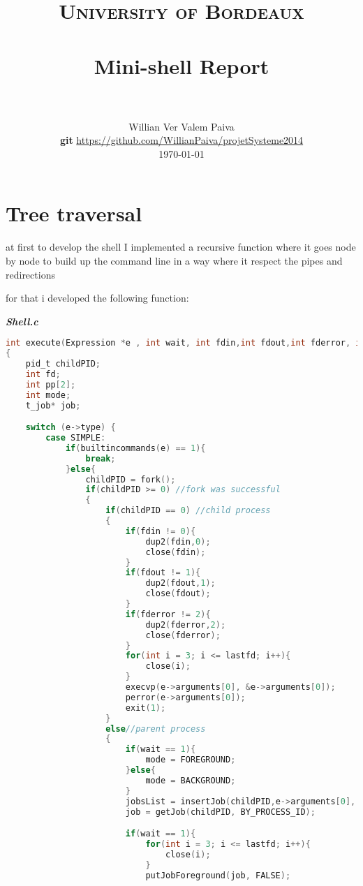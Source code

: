 \documentclass[paper=a4, fontsize=11pt]{scrartcl}
\title{
		\usefont{OT1}{bch}{b}{n}
		\normalfont \normalsize \textsc{University of Bordeaux} \\ [25pt]
		\horrule{0.5pt} \\[0.4cm]
		\huge Mini-shell Report  \\
		\horrule{2pt} \\[0.5cm]
}
\author{
		\normalfont 								\normalsize
        Willian Ver Valem Paiva\\[-3pt]		\normalsize
       \textbf{ git}  \url{https://github.com/WillianPaiva/projetSysteme2014} \\
        \today
}
\date{}
\numberwithin{equation}{section}		%
\numberwithin{figure}{section}			%
\numberwithin{table}{section}				%
\begin{document}
\maketitle
\section{Tree traversal}
at first to develop the shell I implemented a recursive function where it goes node by node to build up the command line in a way where it respect the pipes and redirections 

for that i developed the following function:

\textbf{\emph{Shell.c}}


\begin{lstlisting}[language=c]
int execute(Expression *e , int wait, int fdin,int fdout,int fderror, int lastflag, int futurewait)
{
    pid_t childPID;
    int fd;
    int pp[2];
    int mode;
    t_job* job;

    switch (e->type) {
        case SIMPLE:
            if(builtincommands(e) == 1){
                break;    
            }else{
                childPID = fork();
                if(childPID >= 0) //fork was successful
                {
                    if(childPID == 0) //child process
                    {
                        if(fdin != 0){
                            dup2(fdin,0);
                            close(fdin);
                        }
                        if(fdout != 1){
                            dup2(fdout,1);
                            close(fdout);
                        }
                        if(fderror != 2){
                            dup2(fderror,2);
                            close(fderror);
                        }
                        for(int i = 3; i <= lastfd; i++){
                            close(i);
                        }
                        execvp(e->arguments[0], &e->arguments[0]);
                        perror(e->arguments[0]);
                        exit(1);
                    }
                    else//parent process
                    {
                        if(wait == 1){
                            mode = FOREGROUND;
                        }else{
                            mode = BACKGROUND;
                        }
                        jobsList = insertJob(childPID,e->arguments[0], (int) mode,futurewait);
                        job = getJob(childPID, BY_PROCESS_ID);

                        if(wait == 1){
                            for(int i = 3; i <= lastfd; i++){
                                close(i);
                            }
                            putJobForeground(job, FALSE);


\end{lstlisting}
\end{document}
